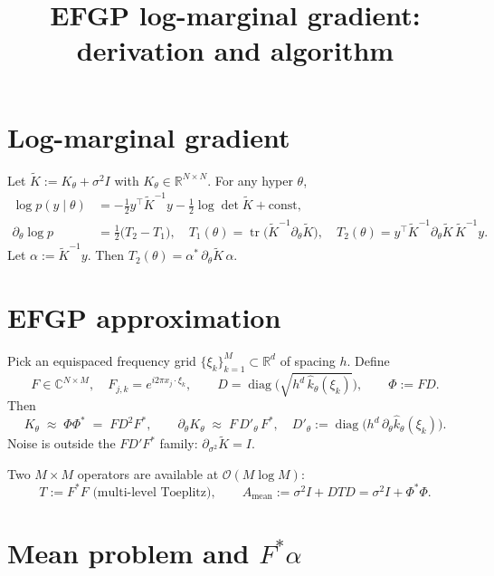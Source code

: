 \documentclass[11pt]{article}
\title{EFGP log-marginal gradient: derivation and algorithm}
\author{}
\date{}
\newcommand{\tr}{\operatorname{tr}}
\newcommand{\bigo}{\mathcal{O}}
\newcommand{\Ktil}{\widetilde K}
\newcommand{\Amean}{A_{\text{mean}}}
\begin{document}
\maketitle

\section{Log-marginal gradient}

Let $\Ktil := K_\theta + \sigma^2 I$ with $K_\theta\in\mathbb{R}^{N\times N}$. For any hyper $\theta$,
\begin{align}
  \log p(y\mid\theta) &= -\tfrac12 y^\top \Ktil^{-1} y - \tfrac12\log\det\Ktil + \text{const}, \\
  \partial_\theta\log p &= \tfrac12\bigl(T_2 - T_1\bigr),\quad
  T_1(\theta) = \tr\!\bigl(\Ktil^{-1}\partial_\theta\Ktil\bigr),\quad
  T_2(\theta) = y^\top \Ktil^{-1}\partial_\theta\Ktil\,\Ktil^{-1}y.
\end{align}
Let $\alpha := \Ktil^{-1}y$. Then $T_2(\theta) = \alpha^*\,\partial_\theta\Ktil\,\alpha$.

\section{EFGP approximation}

Pick an equispaced frequency grid $\{\xi_k\}_{k=1}^M\subset\mathbb{R}^d$ of spacing $h$. Define
\begin{equation}
  F\in\mathbb{C}^{N\times M},\quad F_{j,k} = e^{i2\pi x_j\cdot\xi_k},\qquad
  D = \operatorname{diag}\bigl(\sqrt{h^d\,\hat k_\theta(\xi_k)}\bigr),\qquad
  \Phi := FD.
\end{equation}
Then
\begin{equation}
  K_\theta \;\approx\; \Phi\Phi^* \;=\; FD^2F^*,\qquad
  \partial_\theta K_\theta \;\approx\; F\,D'_\theta\,F^*,\quad
  D'_\theta := \operatorname{diag}\bigl(h^d\,\partial_\theta\hat k_\theta(\xi_k)\bigr).
\end{equation}
Noise is outside the $FD'F^*$ family: $\partial_{\sigma^2}\Ktil = I$.

Two $M{\times}M$ operators are available at $\bigo(M\log M)$:
\begin{equation}
  T := F^*F \text{ (multi-level Toeplitz)},\qquad
  \Amean := \sigma^2 I + DTD = \sigma^2 I + \Phi^*\Phi.
\end{equation}

\section{Mean problem and $F^*\alpha$}
\end{document}
